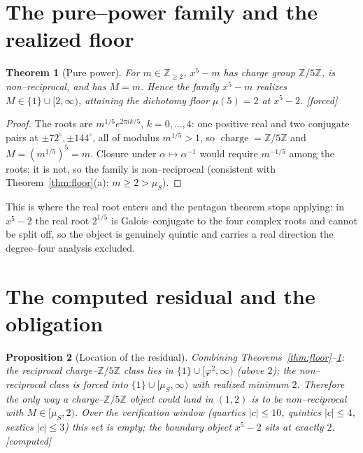 \documentclass[11pt]{article}
\newcommand{\forced}{\textcolor{cforced}{\textsf{[forced]}}}
\newcommand{\computed}{\textcolor{ccomp}{\textsf{[computed]}}}
\newcommand{\Z}{\mathbb{Z}}
\newcommand{\Mah}{M}
\newcommand{\muS}{\mu_S}
\newcommand{\Zfive}{\Z/5\Z}
\DeclareMathOperator{\charge}{charge}
\theoremstyle{plain}
\newtheorem{theorem}{Theorem}[section]
\newtheorem{proposition}[theorem]{Proposition}
\theoremstyle{definition}
\theoremstyle{remark}
\begin{document}
\section{The pure--power family and the realized floor}\label{sec:purepower}

\begin{theorem}[Pure power]\label{thm:purepower}
For $m\in\Z_{\ge2}$, $x^5-m$ has charge group $\Zfive$, is non--reciprocal, and has $\Mah=m$. Hence
the family $x^5-m$ realizes $\Mah\in\{1\}\cup[2,\infty)$, attaining the dichotomy floor $\mu(5)=2$ at
$x^5-2$. \forced{}
\end{theorem}
\begin{proof}
The roots are $m^{1/5}e^{2\pi ik/5}$, $k=0,\dots,4$: one positive real and two conjugate pairs at
$\pm72^\circ,\pm144^\circ$, all of modulus $m^{1/5}>1$, so $\charge=\Zfive$ and
$\Mah=(m^{1/5})^5=m$. Closure under $\alpha\mapsto\alpha^{-1}$ would require $m^{-1/5}$ among the
roots; it is not, so the family is non--reciprocal (consistent with Theorem~\ref{thm:floor}(a):
$m\ge2>\muS$).
\end{proof}

This is where the real root enters and the pentagon theorem stops applying: in $x^5-2$ the real root
$2^{1/5}$ is Galois--conjugate to the four complex roots and cannot be split off, so the object is
genuinely quintic and carries a real direction the degree--four analysis excluded.

\section{The computed residual and the obligation}\label{sec:residual}

\begin{proposition}[Location of the residual]\label{prop:residual}
Combining Theorems~\ref{thm:floor}--\ref{thm:purepower}: the reciprocal charge--$\Zfive$ class lies in
$\{1\}\cup[\varphi^2,\infty)$ (above $2$); the non--reciprocal class is forced into
$\{1\}\cup[\muS,\infty)$ with realized minimum $2$. Therefore the only way a charge--$\Zfive$ object
could land in $(1,2)$ is to be non--reciprocal with $\Mah\in[\muS,2)$. Over the verification window
(quartics $|c|\le10$, quintics $|c|\le4$, sextics $|c|\le3$) this set is empty; the boundary object
$x^5-2$ sits at exactly $2$. \computed{}
\end{proposition}
\end{document}
